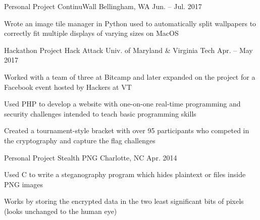 

\begin{cventries}

  \cventry
    {Personal Project} %
    {ContinuWall} %
    {Bellingham, WA} %
    {Jun. – Jul. 2017} %
    {
      \begin{cvitems} %
      \item {Wrote an image tile manager in Python used to automatically split wallpapers to correctly fit multiple displays of varying sizes on MacOS}
      \end{cvitems}
    }

  \cventry
    {Hackathon Project} %
    {Hack Attack} %
    {Univ. of Maryland \& Virginia Tech} %
    {Apr. – May 2017} %
    {
      \begin{cvitems} %
      \item {Worked with a team of three at Bitcamp and later expanded on the project for a Facebook event hosted by Hackers at VT}
      \item {Used PHP to develop a website with one-on-one real-time programming and security challenges intended to teach basic programming skills}
      \item {Created a tournament-style bracket with over 95 participants who competed in the cryptography and capture the flag challenges}
      \end{cvitems}
    }

  \cventry
    {Personal Project} %
    {Stealth PNG} %
    {Charlotte, NC} %
    {Apr. 2014} %
    {
      \begin{cvitems} %
      \item {Used C to write a steganography program which hides plaintext or files inside PNG images}
      \item {Works by storing the encrypted data in the two least significant bits of pixels (looks unchanged to the human eye)}
      \end{cvitems}
    }

\end{cventries}
